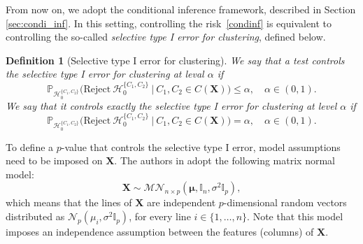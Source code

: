 \documentclass[a4paper,11pt]{article}
\theoremstyle{plain}
\newcommand{\1}{\mathbf{1}}
\newtheorem{definition}{Definition}
\begin{document}
From now on, we adopt the conditional inference framework, described in Section \ref{sec:condi_inf}. In this setting, controlling the risk~\eqref{condinf} is equivalent to controlling the so-called \textit{selective type I error for clustering}, defined below.
\begin{definition}[Selective type I error for clustering]
  We say that a test controls the selective type I error for clustering at leval $\alpha$ if
  \begin{equation}
    \mathbb{P}_{\mathcal{H}_0^{\{C_1,C_2\}}}\bigl(\text{Reject} ~ \mathcal{H}_0^{\{C_1,C_2\}} ~ | ~ C_1,C_2 \in C(\mathbf{X})\bigr) \leq \alpha,\quad \alpha \in (0,1).
  \end{equation}
  We say that it controls exactly the selective type I error for clustering at level $\alpha$ if
  \begin{equation}
  \mathbb{P}_{\mathcal{H}_0^{\{C_1,C_2\}}}\bigl(\text{Reject} ~ \mathcal{H}_0^{\{C_1,C_2\}} ~ | ~ C_1,C_2 \in C(\mathbf{X})\bigr) = \alpha, \quad \alpha \in (0,1).
\end{equation}
\end{definition}
To define a $p$-value that controls the selective type I error, model assumptions need to be imposed on $\mathbf{X}$. The authors in \cite{Gao} adopt the following matrix normal model:
\begin{equation}\label{matrixnormal}
\mathbf{X}\sim\mathcal{MN}_{n\times p}(\boldsymbol{\mu},\mathbb{I}_n,\sigma^2\mathbb{I}_p),
\end{equation}
which means that the lines of $\mathbf{X}$ are independent $p$-dimensional random vectors distributed as $\mathcal{N}_p(\mu_i,\sigma^2\mathbb{I}_p)$, for every line $i\in\lbrace 1,\ldots,n\rbrace$. Note that this model imposes an independence assumption between the features (columns) of $\mathbf{X}$.
\end{document}
